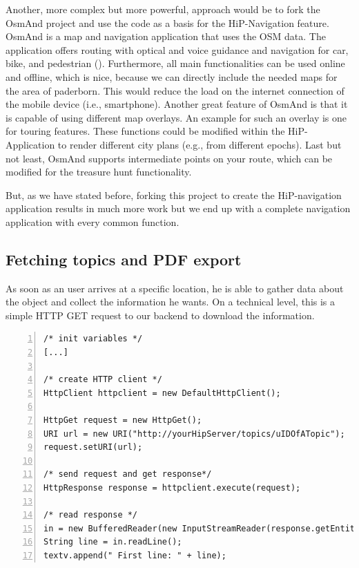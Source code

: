 Another, more complex but more powerful, approach would be to fork the \ac{OsmAnd} project and use the code as a basis for the HiP-Navigation feature. \ac{OsmAnd} is a map and navigation application that uses the \ac{OSM} data. The application offers routing with optical and voice guidance and navigation for car, bike, and pedestrian (\cite{osmand}). Furthermore, all main functionalities can be used online and offline, which is nice, because we can directly include the needed maps for the area of paderborn. This would reduce the load on the internet connection of the mobile device (i.e., smartphone). Another great feature of \ac{OsmAnd} is that it is capable of using different map overlays. An example for such an overlay is one for touring features. These functions could be modified within the HiP-Application to render different city plans (e.g., from different epochs). Last but not least, \ac{OsmAnd} supports intermediate points on your route, which can be modified for the treasure hunt functionality.


But, as we have stated before, forking this project to create the \ac{HiP}-navigation application results in much more work but we end up with a complete navigation application with every common function. 

\subsection{Fetching topics and PDF export}
As soon as an user arrives at a specific location, he is able to gather data about the object and collect the information he wants. On a technical level, this is a simple \ac{HTTP} GET request to our backend to download the information.

\begin{lstlisting}[numbers=left,caption={Creation and usage of an Android HTTP client},label=Android:HTTP,frame=tlbr,breaklines]
/* init variables */
[...]

/* create HTTP client */
HttpClient httpclient = new DefaultHttpClient();

HttpGet request = new HttpGet();
URI url = new URI("http://yourHipServer/topics/uIDOfATopic");
request.setURI(url);

/* send request and get response*/
HttpResponse response = httpclient.execute(request);

/* read response */
in = new BufferedReader(new InputStreamReader(response.getEntity().getContent()));
String line = in.readLine();
textv.append(" First line: " + line);
\end{lstlisting}


